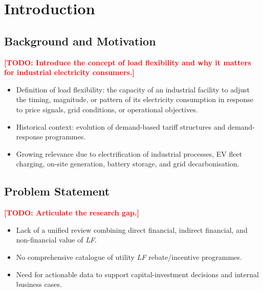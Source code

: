 \documentclass[12pt, a4paper, twocolumn]{article}
\newcommand{\LF}{\textit{LF}}
\newcommand{\TODO}[1]{\textcolor{red}{\textbf{[TODO: #1]}}}
\begin{document}

\section{Introduction}
\label{sec:introduction}

\subsection{Background and Motivation}
\TODO{Introduce the concept of load flexibility and why it matters for industrial electricity consumers.}

\begin{itemize}[nosep]
  \item Definition of load flexibility: the capacity of an industrial facility to adjust the timing, magnitude, or pattern of its electricity consumption in response to price signals, grid conditions, or operational objectives.
  \item Historical context: evolution of demand-based tariff structures and demand-response programmes.
  \item Growing relevance due to electrification of industrial processes, EV fleet charging, on-site generation, battery storage, and grid decarbonisation.
\end{itemize}

\subsection{Problem Statement}
\TODO{Articulate the research gap.}

\begin{itemize}[nosep]
  \item Lack of a unified review combining direct financial, indirect financial, and non-financial value of \LF{}.
  \item No comprehensive catalogue of utility \LF{} rebate/incentive programmes.
  \item Need for actionable data to support capital-investment decisions and internal business cases.
\end{itemize}
\end{document}
